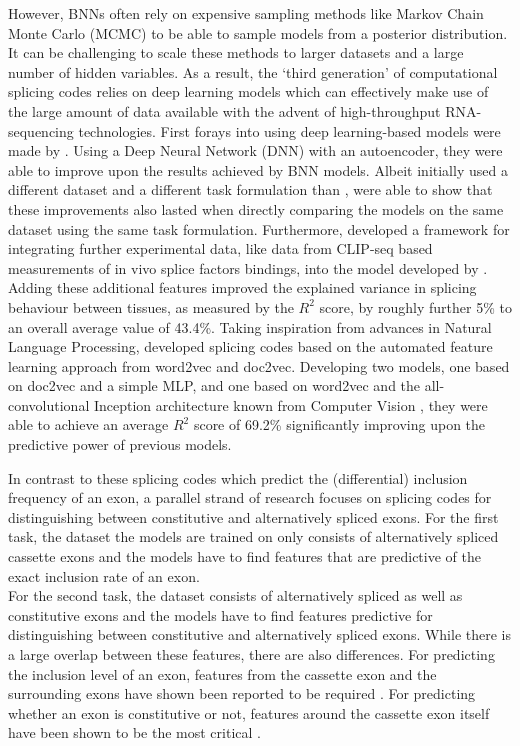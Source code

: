 However, BNNs often rely on expensive sampling methods like Markov Chain Monte Carlo (MCMC) to be able to sample models from a posterior distribution. It can be challenging to scale these methods to larger datasets and a large number of hidden variables.
As a result, the `third generation' of computational splicing codes relies on deep learning models which can effectively make use of the large amount of data available with the advent of high-throughput RNA-sequencing technologies. First forays into using deep learning-based models were made by \cite{leung2014}. Using a Deep Neural Network (DNN) with an autoencoder, they were able to improve upon the results achieved by BNN models. Albeit \cite{leung2014} initially used a different dataset and a different task formulation than \cite{bnnsplicing}, \cite{jha} were able to show that these improvements also lasted when directly comparing the models on the same dataset using the same task formulation. Furthermore, \cite{jha} developed a framework for integrating further experimental data, like data from CLIP-seq based measurements of in vivo splice factors bindings, into the model developed by \cite{leung2014}. Adding these additional features improved the explained variance in splicing behaviour between tissues, as measured by the $R^2$ score, by roughly further 5\% to an overall average value of 43.4\%.
Taking inspiration from advances in Natural Language Processing, \cite{d2vsplicing} developed splicing codes based on the automated feature learning approach from word2vec and doc2vec. Developing two models, one based on doc2vec and a simple MLP, and one based on word2vec and the all-convolutional Inception architecture known from Computer Vision \cite{inception}, they were able to achieve an average $R^2$ score of 69.2\% significantly improving upon the predictive power of previous models.


In contrast to these splicing codes which predict the (differential) inclusion frequency of an exon, a parallel strand of research focuses on splicing codes for distinguishing between constitutive and alternatively spliced exons. For the first task, the dataset the models are trained on only consists of alternatively spliced cassette exons and the models have to find features that are predictive of the exact inclusion rate of an exon.\\
For the second task, the dataset consists of alternatively spliced as well as constitutive exons and the models have to find features predictive for distinguishing between constitutive and alternatively spliced exons.
While there is a large overlap between these features, there are also differences.
For predicting the inclusion level of an exon, features from the cassette exon and the surrounding exons have shown been reported to be required \cite{splicingcodegood1}. For predicting whether an exon is constitutive or not, features around the cassette exon itself have been shown to be the most critical \cite{featurearoundexonjunc}. 

